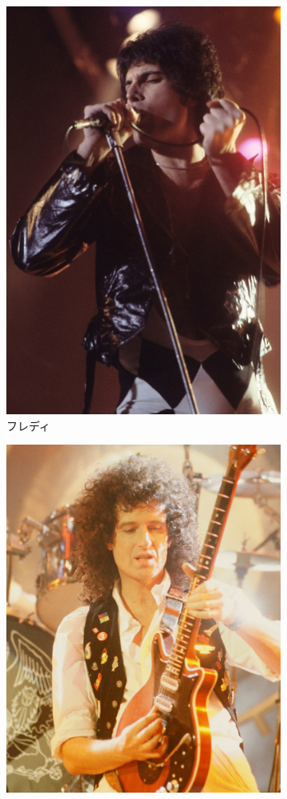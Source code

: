 \documentclass[a4j, twocolumn]{jarticle}
\begin{document}
\begin{figure}[htb]
  \centering
  \begin{subfigure}[b]{0.15\textwidth}
      \centering
      \includegraphics[height=\textwidth]{Freddie.jpg}
      \vspace{-1.0mm}
      \caption{フレディ}
      \label{freddieimg}
  \end{subfigure}
  \begin{subfigure}[b]{0.15\textwidth}
      \centering
      \includegraphics[height=\textwidth]{Brian.jpg}

\end{subfigure}
\end{figure}
\end{document}
